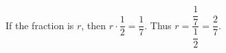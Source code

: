 If the fraction is $r$, then $r\cdot\dfrac{1}{2}=\dfrac{1}{7}$. Thus $r=\dfrac{\dfrac{1}{7}}{\dfrac{1}{2}}=\boxed{\dfrac{2}{7}}$.
